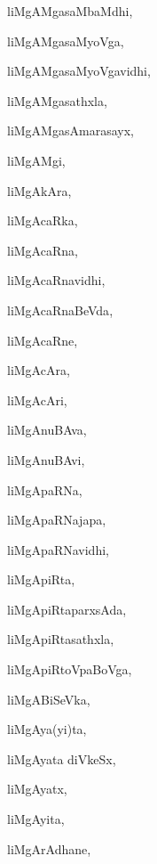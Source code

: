 \begin{multicols}{3}
{\noindent
{liMgAMgasaMbaMdhi}, \pageref{liMgAMgasaMbaMdhi}

\noindent
{liMgAMgasaMyoVga}, \pageref{liMgAMgasaMyoVga}

\noindent
{liMgAMgasaMyoVgavidhi}, \pageref{liMgAMgasaMyoVgavidhi}

\noindent
{liMgAMgasathxla}, \pageref{liMgAMgasathxla}

\noindent
{liMgAMgasAmarasayx}, \pageref{liMgAMgasAmarasayx}

\noindent
{liMgAMgi}, \pageref{liMgAMgi}

\noindent
{liMgAkAra}, \pageref{liMgAkAra}

\noindent
{liMgAcaRka}, \pageref{liMgAcaRka}

\noindent
{liMgAcaRna}, \pageref{liMgAcaRna}

\noindent
{liMgAcaRnavidhi}, \pageref{liMgAcaRnavidhi}

\noindent
{liMgAcaRnaBeVda}, \pageref{liMgAcaRnaBeVda}

\noindent
{liMgAcaRne}, \pageref{liMgAcaRne}

\noindent
{liMgAcAra}, \pageref{liMgAcAra}

\noindent
{liMgAcAri}, \pageref{liMgAcAri}

\noindent
{liMgAnuBAva}, \pageref{liMgAnuBAva}

\noindent
{liMgAnuBAvi}, \pageref{liMgAnuBAvi}

\noindent
{liMgApaRNa}, \pageref{liMgApaRNa}

\noindent
{liMgApaRNajapa}, \pageref{liMgApaRNajapa}

\noindent
{liMgApaRNavidhi}, \pageref{liMgApaRNavidhi}

\noindent
{liMgApiRta}, \pageref{liMgApiRta}

\noindent
{liMgApiRtaparxsAda}, \pageref{liMgApiRtaparxsAda}

\noindent
{liMgApiRtasathxla}, \pageref{liMgApiRtasathxla}

\noindent
{liMgApiRtoVpaBoVga}, \pageref{liMgApiRtoVpaBoVga}

\noindent
{liMgABiSeVka}, \pageref{liMgABiSeVka}

\noindent
{liMgAya(yi)ta}, \pageref{liMgAyayita}

\noindent
{liMgAyata diVkeSx}, \pageref{liMgAyatadiVkeSx}

\noindent
{liMgAyatx}, \pageref{liMgAyatx}

\noindent
{liMgAyita}, \pageref{liMgAyita}

\noindent
{liMgArAdhane}, \pageref{liMgArAdhane}

}
\end{multicols}
